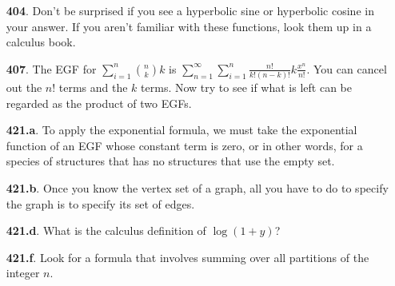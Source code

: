 \documentclass[10pt,]{book}
\theoremstyle{plain}
\theoremstyle{definition}
\theoremstyle{definition}
\numberwithin{equation}{chapter}
\begin{document}
\begin{itemize}[itemsep=1em]
\item[\textbf{404}.]\hypertarget{p-2150}{}%
Don't be surprised if you see a hyperbolic sine or hyperbolic cosine in your answer. If you aren't familiar with these functions, look them up in a calculus book.%

\item[\textbf{407}.]\hypertarget{p-2158}{}%
The EGF for \(\sum_{i=1}^n\binom{n}{k}k\) is \(\sum_{n=1}^\infty \sum_{i=1}^n \frac{n!}{k!(n-k)!}k\frac{x^n}{n!}\).  You can cancel out the \(n!\) terms and the \(k\) terms.  Now try to see if what is left can be regarded as the product of two EGFs.%

\item[\textbf{421.a}.]\hypertarget{p-2205}{}%
To apply the exponential formula, we must take the exponential function of an EGF whose constant term is zero, or in other words, for a species of structures that has no structures that use the empty set.%

\item[\textbf{421.b}.]\hypertarget{p-2208}{}%
Once you know the vertex set of a graph, all you have to do to specify the graph is to specify its set of edges.%

\item[\textbf{421.d}.]\hypertarget{p-2213}{}%
What is the calculus definition of \(\log(1+y)\)?%

\item[\textbf{421.f}.]\hypertarget{p-2218}{}%
Look for a formula that involves summing over all partitions of the integer \(n\).%

\end{itemize}
\typeout{************************************************}
\typeout{************************************************}
\end{document}
